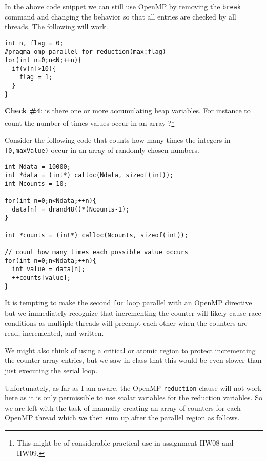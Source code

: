 In the above code snippet we can still use OpenMP by removing the \texttt{break} command and changing the behavior so that all entries are checked by all threads. The following will work.

\begin{verbatim}
int n, flag = 0;
#pragma omp parallel for reduction(max:flag)
for(int n=0;n<N;++n){
  if(v[n]>10){
    flag = 1;
  }
}
\end{verbatim}

{\bf Check \#4}: is there one or more accumulating heap variables. For instance to count the number of times values occur in an array ?\footnote{This might be of considerable practical use in assignment HW08 and HW09.}

Consider the following code that counts how many times the integers in \texttt{[0,maxValue)} occur in an array of randomly chosen numbers.
\begin{verbatim}
int Ndata = 10000;
int *data = (int*) calloc(Ndata, sizeof(int));
int Ncounts = 10;

for(int n=0;n<Ndata;++n){
  data[n] = drand48()*(Ncounts-1);
}

int *counts = (int*) calloc(Ncounts, sizeof(int));

// count how many times each possible value occurs
for(int n=0;n<Ndata;++n){
  int value = data[n];
  ++counts[value];
}
\end{verbatim}

It is tempting to make the second \texttt{for} loop parallel with an OpenMP directive but we immediately recognize that incrementing the counter will likely cause race conditions as multiple threads will preempt each other when the counters are read, incremented, and written. 

We might also think of using a critical or atomic region to protect incrementing the counter array entries, but we saw in class that this would be even slower than just executing the serial loop.

Unfortunately, as far as I am aware, the OpenMP \texttt{reduction} clause will not work here as it is only permissible to use scalar variables for the reduction variables. So we are left with the task of manually creating an array of counters for each OpenMP thread which we then sum up after the parallel region as follows.

